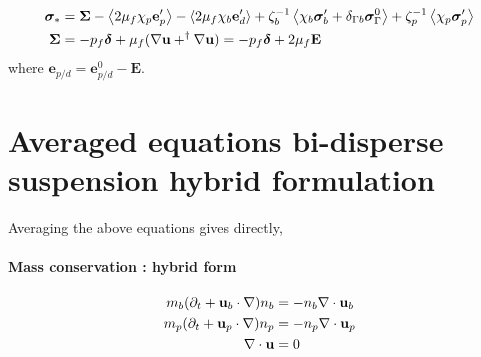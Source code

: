 \documentclass[12pt]{My_preprint}
\begin{document}
\begin{align}
    \bm\sigma_* &= 
    \bm\Sigma 
    - \left<2\mu_f \chi_{p} \textbf{e}_p'\right>- \left<2\mu_f \chi_{b} \textbf{e}_d'\right>
    +\zeta_b^{-1} \left<\chi_b \bm\sigma_b' + \delta_{\Gamma b} \bm\sigma_\Gamma^0\right>  
    +\zeta_p^{-1} \left<\chi_p \bm\sigma_p'\right> \\
    \bm\Sigma
    &=
    -p_f\bm\delta
    + \mu_f (\mathbf{\nabla} \textbf{u} + ^\dagger\mathbf{\nabla} \textbf{u})
    =
    -p_f\bm\delta
    +2 \mu_f \textbf{E}
\end{align}
where $\textbf{e}_{p/d} = \textbf{e}_{p/d}^0 - \textbf{E}$. 


\section{Averaged equations bi-disperse suspension hybrid formulation}

Averaging the above equations gives directly, 
\paragraph*{Mass conservation : hybrid form}
\begin{align}
    m_b (\partial_t + \textbf{u}_b \cdot \mathbf{\nabla} )n_b &= - n_b \mathbf{\nabla}\cdot \textbf{u}_b\\
    m_p (\partial_t + \textbf{u}_p \cdot \mathbf{\nabla} )n_p &= - n_p \mathbf{\nabla}\cdot \textbf{u}_p\\
    \mathbf{\nabla}\cdot \textbf{u}
    &= 
    0
\end{align}
\end{document}
